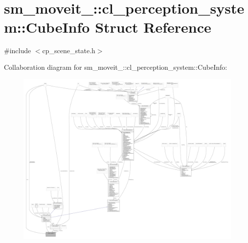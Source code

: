 \hypertarget{structsm__moveit__4_1_1cl__perception__system_1_1CubeInfo}{}\section{sm\+\_\+moveit\+\_\+:\+:cl\+\_\+perception\+\_\+system\+:\+:Cube\+Info Struct Reference}
\label{structsm__moveit__4_1_1cl__perception__system_1_1CubeInfo}


{\ttfamily \#include $<$cp\+\_\+scene\+\_\+state.\+h$>$}



Collaboration diagram for sm\+\_\+moveit\+\_\+:\+:cl\+\_\+perception\+\_\+system\+:\+:Cube\+Info\+:
\nopagebreak
\begin{figure}[H]
\begin{center}
\leavevmode
\includegraphics[width=350pt]{structsm__moveit__4_1_1cl__perception__system_1_1CubeInfo__coll__graph}
\end{center}
\end{figure}
